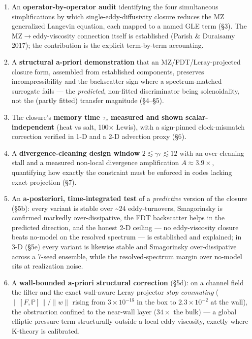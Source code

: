 \documentclass[aps,prfluids,preprint,superscriptaddress,nofootinbib]{revtex4-2}
\begin{document}
\begin{enumerate}
\item An \textbf{operator-by-operator audit} identifying the four simultaneous simplifications by which single-eddy-diffusivity closure reduces the MZ generalized Langevin equation, each mapped to a named GLE term (§3). The MZ\ensuremath{\to}eddy-viscosity connection itself is established (Parish \& Duraisamy 2017); the contribution is the explicit term-by-term accounting.
\item A \textbf{structural a-priori demonstration} that an MZ/FDT/Leray-projected closure form, assembled from established components, preserves incompressibility and the backscatter sign where a spectrum-matched surrogate fails — the \emph{predicted}, non-fitted discriminator being solenoidality, not the (partly fitted) transfer magnitude (§4–§5).
\item The closure's \textbf{memory time $\tau _{c}$ measured and shown scalar-independent} (heat vs salt, 100\ensuremath{\times} Lewis), with a sign-pinned clock-mismatch correction verified in 1-D and a 2-D advection proxy (§6).
\item A \textbf{divergence-cleaning design window} $2\lesssim \gamma \tau \lesssim 12$ with an over-cleaning stall and a measured non-local divergence amplification $A\approx 3.9\times $, quantifying how exactly the constraint must be enforced in codes lacking exact projection (§7).
\item An \textbf{a-posteriori, time-integrated test} of a \emph{predictive} version of the closure (§5b): every variant is stable over \textasciitilde{}24 eddy-turnovers, Smagorinsky is confirmed markedly over-dissipative, the FDT backscatter helps in the predicted direction, and the honest 2-D ceiling — no eddy-viscosity closure beats no-model on the resolved spectrum — is established and explained; in 3-D (§5e) every variant is likewise stable and Smagorinsky over-dissipative across a 7-seed ensemble, while the resolved-spectrum margin over no-model sits at realization noise.
\item A \textbf{wall-bounded a-priori structural correction} (\S5d): on a channel field the filter and the exact wall-aware Leray projector \emph{stop commuting} ($\|[F,\mathbb{P}]\|/\|w\|$ rising from $3\times 10^{-16}$ in the box to $2.3\times 10^{-2}$ at the wall), the obstruction confined to the near-wall layer ($34\times$ the bulk) --- a global elliptic-pressure term structurally outside a local eddy viscosity, exactly where K-theory is calibrated.
\end{enumerate}
\end{document}
